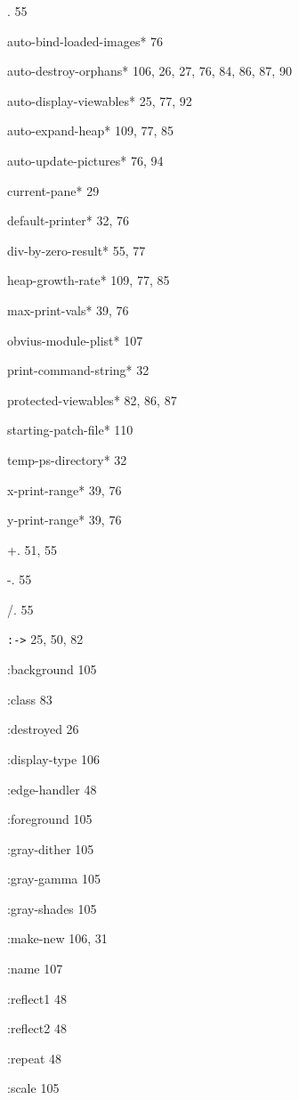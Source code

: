 
\begin{theindex}
\item *. 55
\item *auto-bind-loaded-images* 76
\item *auto-destroy-orphans* 106, 26, 27, 76, 84, 86, 87, 90
\item *auto-display-viewables* 25, 77, 92
\item *auto-expand-heap* 109, 77, 85
\item *auto-update-pictures* 76, 94
\item *current-pane* 29
\item *default-printer* 32, 76
\item *div-by-zero-result* 55, 77
\item *heap-growth-rate* 109, 77, 85
\item *max-print-vals* 39, 76
\item *obvius-module-plist* 107
\item *print-command-string* 32
\item *protected-viewables* 82, 86, 87
\item *starting-patch-file* 110
\item *temp-ps-directory* 32
\item *x-print-range* 39, 76
\item *y-print-range* 39, 76
\item +. 51, 55
\item -. 55
\item /. 55
\item {\tt :->} 25, 50, 82
\item :background 105
\item :class 83
\item :destroyed 26
\item :display-type 106
\item :edge-handler 48
\item :foreground 105
\item :gray-dither 105
\item :gray-gamma 105
\item :gray-shades 105
\item :make-new 106, 31
\item :name 107
\item :reflect1 48
\item :reflect2 48
\item :repeat 48
\item :scale 105

\end{theindex}
